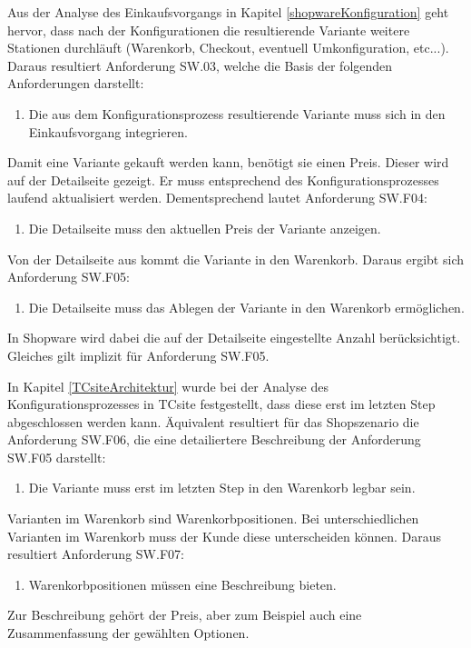 \documentclass[11pt, a4paper, titlepage, listof=totoc, bibliography=totoc, index=totoc, twoside, openright, headings=normal, draft]{scrreprt}
\begin{document}
Aus der Analyse des Einkaufsvorgangs in Kapitel \ref{shopwareKonfiguration} geht hervor, dass nach der Konfigurationen die resultierende Variante weitere Stationen durchläuft (Warenkorb, Checkout, eventuell Umkonfiguration, etc...). Daraus resultiert Anforderung SW.03, welche die Basis der folgenden Anforderungen darstellt:
\begin{enumerate}[SW.F03:]\bfseries
\item Die aus dem Konfigurationsprozess resultierende Variante muss sich in den Einkaufsvorgang integrieren.
\end{enumerate}
Damit eine Variante gekauft werden kann, benötigt sie einen Preis. Dieser wird auf der Detailseite gezeigt. Er muss entsprechend des Konfigurationsprozesses laufend aktualisiert werden. Dementsprechend lautet Anforderung SW.F04:
\begin{enumerate}[SW.F04:]\bfseries
\item Die Detailseite muss den aktuellen Preis der Variante anzeigen.
\end{enumerate}
Von der Detailseite aus kommt die Variante in den Warenkorb. Daraus ergibt sich Anforderung SW.F05:
\begin{enumerate}[SW.F05:]\bfseries
\item Die Detailseite muss das Ablegen der Variante in den Warenkorb ermöglichen.
\end{enumerate}
In Shopware wird dabei die auf der Detailseite eingestellte Anzahl berücksichtigt. Gleiches gilt implizit für Anforderung SW.F05.

In Kapitel \ref{TCsiteArchitektur} wurde bei der Analyse des Konfigurationsprozesses in TCsite festgestellt, dass diese erst im letzten Step abgeschlossen werden kann. Äquivalent resultiert für das Shopszenario die Anforderung SW.F06, die eine detailiertere Beschreibung der Anforderung SW.F05 darstellt:
\begin{enumerate}[SW.F06:]\bfseries
\item Die Variante muss erst im letzten Step in den Warenkorb legbar sein.
\end{enumerate}
Varianten im Warenkorb sind Warenkorbpositionen. Bei unterschiedlichen Varianten im Warenkorb muss der Kunde diese unterscheiden können. Daraus resultiert Anforderung SW.F07:
\begin{enumerate}[SW.F07:]\bfseries
\item Warenkorbpositionen müssen eine Beschreibung bieten.
\end{enumerate}
Zur Beschreibung gehört der Preis, aber zum Beispiel auch eine Zusammenfassung der gewählten Optionen.
\end{document}
